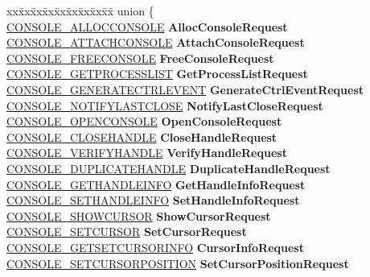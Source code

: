 \begin{DoxyCompactItemize}
\begin{tabbing}
xx\=xx\=xx\=xx\=xx\=xx\=xx\=xx\=xx\=\kill
union \{\\
\>\hyperlink{struct___c_o_n_s_o_l_e___a_l_l_o_c_c_o_n_s_o_l_e}{CONSOLE\_ALLOCCONSOLE} {\bfseries AllocConsoleRequest}\\
\>\hyperlink{struct___c_o_n_s_o_l_e___a_t_t_a_c_h_c_o_n_s_o_l_e}{CONSOLE\_ATTACHCONSOLE} {\bfseries AttachConsoleRequest}\\
\>\hyperlink{struct___c_o_n_s_o_l_e___f_r_e_e_c_o_n_s_o_l_e}{CONSOLE\_FREECONSOLE} {\bfseries FreeConsoleRequest}\\
\>\hyperlink{struct___c_o_n_s_o_l_e___g_e_t_p_r_o_c_e_s_s_l_i_s_t}{CONSOLE\_GETPROCESSLIST} {\bfseries GetProcessListRequest}\\
\>\hyperlink{struct___c_o_n_s_o_l_e___g_e_n_e_r_a_t_e_c_t_r_l_e_v_e_n_t}{CONSOLE\_GENERATECTRLEVENT} {\bfseries GenerateCtrlEventRequest}\\
\>\hyperlink{struct___c_o_n_s_o_l_e___n_o_t_i_f_y_l_a_s_t_c_l_o_s_e}{CONSOLE\_NOTIFYLASTCLOSE} {\bfseries NotifyLastCloseRequest}\\
\>\hyperlink{struct___c_o_n_s_o_l_e___o_p_e_n_c_o_n_s_o_l_e}{CONSOLE\_OPENCONSOLE} {\bfseries OpenConsoleRequest}\\
\>\hyperlink{struct___c_o_n_s_o_l_e___c_l_o_s_e_h_a_n_d_l_e}{CONSOLE\_CLOSEHANDLE} {\bfseries CloseHandleRequest}\\
\>\hyperlink{struct___c_o_n_s_o_l_e___v_e_r_i_f_y_h_a_n_d_l_e}{CONSOLE\_VERIFYHANDLE} {\bfseries VerifyHandleRequest}\\
\>\hyperlink{struct___c_o_n_s_o_l_e___d_u_p_l_i_c_a_t_e_h_a_n_d_l_e}{CONSOLE\_DUPLICATEHANDLE} {\bfseries DuplicateHandleRequest}\\
\>\hyperlink{struct___c_o_n_s_o_l_e___g_e_t_h_a_n_d_l_e_i_n_f_o}{CONSOLE\_GETHANDLEINFO} {\bfseries GetHandleInfoRequest}\\
\>\hyperlink{struct___c_o_n_s_o_l_e___s_e_t_h_a_n_d_l_e_i_n_f_o}{CONSOLE\_SETHANDLEINFO} {\bfseries SetHandleInfoRequest}\\
\>\hyperlink{struct___c_o_n_s_o_l_e___s_h_o_w_c_u_r_s_o_r}{CONSOLE\_SHOWCURSOR} {\bfseries ShowCursorRequest}\\
\>\hyperlink{struct___c_o_n_s_o_l_e___s_e_t_c_u_r_s_o_r}{CONSOLE\_SETCURSOR} {\bfseries SetCursorRequest}\\
\>\hyperlink{struct___c_o_n_s_o_l_e___g_e_t_s_e_t_c_u_r_s_o_r_i_n_f_o}{CONSOLE\_GETSETCURSORINFO} {\bfseries CursorInfoRequest}\\
\>\hyperlink{struct___c_o_n_s_o_l_e___s_e_t_c_u_r_s_o_r_p_o_s_i_t_i_o_n}{CONSOLE\_SETCURSORPOSITION} {\bfseries SetCursorPositionRequest}\\

\end{tabbing}
\end{DoxyCompactItemize}
